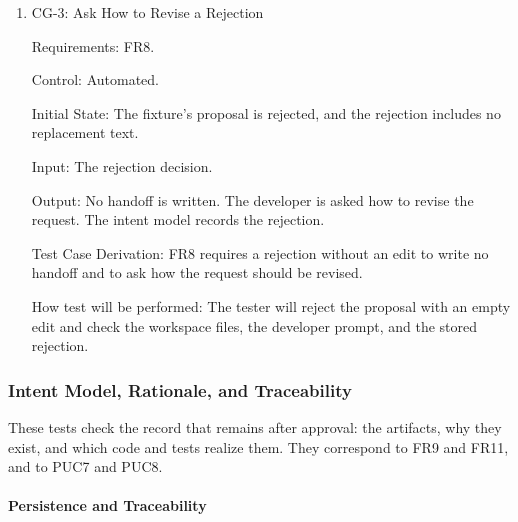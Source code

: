 \documentclass[12pt, titlepage]{article}
\begin{document}
\begin{enumerate}
Input: The developer releases the approved set.

Output: The approved interfaces with their JML contracts are written into
the source tree, and an implementation brief lists the approved requirement
identifiers, the interfaces to implement, and the constraints that apply.
Neither the interfaces nor the brief contain the pending or the rejected
requirement.

Test Case Derivation: FR8 requires the handoff to contain exactly the
approved set, as workspace files that any assistant can read. PUC6 is the
same handoff.

How test will be performed: The tester will release the set and compare the
written interfaces and brief with the approved set in the intent model.
Pending and rejected items are absent.

\item{CG-3: Ask How to Revise a Rejection\\}

Requirements: FR8.

Control: Automated.

Initial State: The fixture's proposal is rejected, and the rejection
includes no replacement text.

Input: The rejection decision.

Output: No handoff is written. The developer is asked how to revise the
request. The intent model records the rejection.

Test Case Derivation: FR8 requires a rejection without an edit to write no
handoff and to ask how the request should be revised.

How test will be performed: The tester will reject the proposal with an
empty edit and check the workspace files, the developer prompt, and the
stored rejection.

\end{enumerate}

\subsubsection{Intent Model, Rationale, and Traceability}

These tests check the record that remains after approval: the artifacts,
why they exist, and which code and tests realize them. They correspond to
FR9 and FR11, and to PUC7 and PUC8.

\paragraph{Persistence and Traceability}
\end{document}
